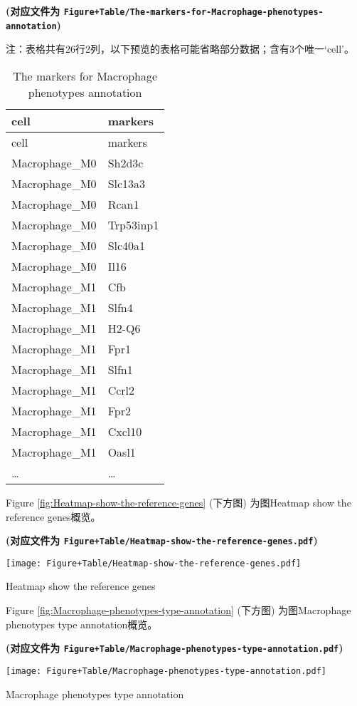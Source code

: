\documentclass[
]{article}
\begin{document}
\textbf{(对应文件为 \texttt{Figure+Table/The-markers-for-Macrophage-phenotypes-annotation})}

\begin{center}\begin{tcolorbox}[colback=gray!10, colframe=gray!50, width=0.9\linewidth, arc=1mm, boxrule=0.5pt]注：表格共有26行2列，以下预览的表格可能省略部分数据；含有3个唯一`cell'。
\end{tcolorbox}
\end{center}

\begin{longtable}[]{@{}ll@{}}
\caption{\label{tab:The-markers-for-Macrophage-phenotypes-annotation}The markers for Macrophage phenotypes annotation}\tabularnewline
\toprule
cell & markers\tabularnewline
\midrule
\endfirsthead
\toprule
cell & markers\tabularnewline
\midrule
\endhead
Macrophage\_M0 & Sh2d3c\tabularnewline
Macrophage\_M0 & Slc13a3\tabularnewline
Macrophage\_M0 & Rcan1\tabularnewline
Macrophage\_M0 & Trp53inp1\tabularnewline
Macrophage\_M0 & Slc40a1\tabularnewline
Macrophage\_M0 & Il16\tabularnewline
Macrophage\_M1 & Cfb\tabularnewline
Macrophage\_M1 & Slfn4\tabularnewline
Macrophage\_M1 & H2-Q6\tabularnewline
Macrophage\_M1 & Fpr1\tabularnewline
Macrophage\_M1 & Slfn1\tabularnewline
Macrophage\_M1 & Ccrl2\tabularnewline
Macrophage\_M1 & Fpr2\tabularnewline
Macrophage\_M1 & Cxcl10\tabularnewline
Macrophage\_M1 & Oasl1\tabularnewline
\ldots{} & \ldots{}\tabularnewline
\bottomrule
\end{longtable}

Figure \ref{fig:Heatmap-show-the-reference-genes} (下方图) 为图Heatmap show the reference genes概览。

\textbf{(对应文件为 \texttt{Figure+Table/Heatmap-show-the-reference-genes.pdf})}

\def\@captype{figure}
\begin{center}
\texttt{[image: Figure+Table/Heatmap-show-the-reference-genes.pdf]}
\caption{Heatmap show the reference genes}\label{fig:Heatmap-show-the-reference-genes}
\end{center}

Figure \ref{fig:Macrophage-phenotypes-type-annotation} (下方图) 为图Macrophage phenotypes type annotation概览。

\textbf{(对应文件为 \texttt{Figure+Table/Macrophage-phenotypes-type-annotation.pdf})}

\def\@captype{figure}
\begin{center}
\texttt{[image: Figure+Table/Macrophage-phenotypes-type-annotation.pdf]}
\caption{Macrophage phenotypes type annotation}\label{fig:Macrophage-phenotypes-type-annotation}
\end{center}
\end{document}
